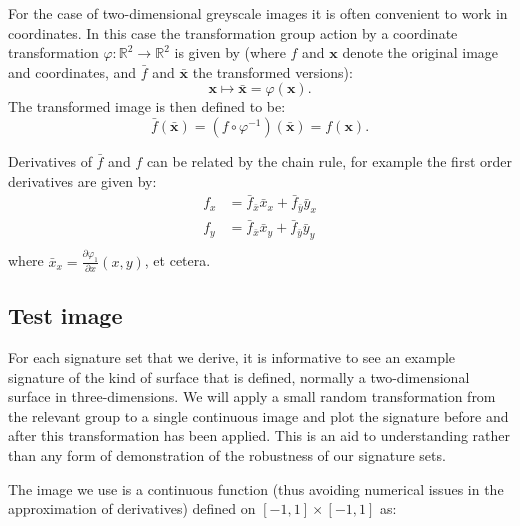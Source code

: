\documentclass[review,onefignum,onetabnum]{siamonline190516}
\begin{document}
For the case of two-dimensional greyscale images it is often convenient to work in coordinates. In this case the transformation group action by a coordinate transformation $\varphi \colon \mathbb{R}^2 \to \mathbb{R}^2$ is given by (where $f$ and $\mathbf{x}$ denote the original image and coordinates, and $\bar{f}$ and $\bar{\mathbf{x}}$ the transformed versions):
\begin{equation}\label{eq:transformation}
  \mathbf{x} \mapsto \bar{\mathbf{x}} = \varphi(\mathbf{x}).
\end{equation}
The transformed image is then defined to be:
\begin{equation}\label{eq:fbarequalsf}
  \bar{f}(\bar{\mathbf{x}}) = (f\circ\varphi^{-1})(\bar{\mathbf{x}}) = f(\mathbf{x}).
\end{equation}

Derivatives of $\bar{f}$ and $f$ can be related by the chain rule, for example the first order derivatives are given by:
\begin{equation}\label{eq:prolongation}
  \begin{aligned}
    f_x &= \bar{f}_{\bar{x}} \bar{x}_x + \bar{f}_{\bar{y}}\bar{y}_x \\
    f_y &= \bar{f}_{\bar{x}} \bar{x}_y + \bar{f}_{\bar{y}}\bar{y}_y \\
  \end{aligned}
\end{equation}
where $\bar{x}_x = \frac{\partial \varphi_1}{\partial x}(x, y)$, et cetera. %

\subsection{Test image}

For each signature set that we derive, it is informative to see an example signature of the kind of surface that is defined, 
normally a two-dimensional surface in three-dimensions.  We will apply a small random transformation from 
the relevant group to a single continuous image and plot the signature before and after this transformation has been applied.
This is an aid to understanding rather than any form of demonstration of the robustness of our signature sets.

The image we use is a continuous function (thus avoiding numerical issues in the approximation 
of derivatives) defined on $[-1,1] \times [-1,1]$ as:
\end{document}

